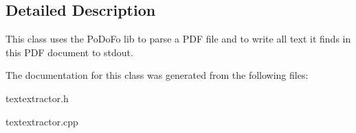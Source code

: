 \subsection{Detailed Description}
This class uses the Po\+Do\+Fo lib to parse a P\+DF file and to write all text it finds in this P\+DF document to stdout. 

The documentation for this class was generated from the following files\+:\begin{DoxyCompactItemize}
\item 
textextractor.\+h\item 
textextractor.\+cpp\end{DoxyCompactItemize}

